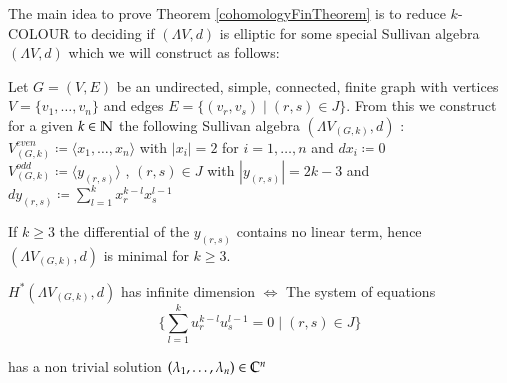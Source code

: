  The main idea to prove Theorem \ref{cohomologyFinTheorem} is to reduce $k$-COLOUR to deciding if $(\Lambda V,d)$ is elliptic for some special 
 Sullivan algebra $(\Lambda V,d)$ which we will construct as follows: \\
 
 \begin{Construction}
 \label{constructionOfSullivanAlgebra}
 Let $G = (V,E)$ be an undirected, simple, connected, finite graph with vertices $ V = \lbrace v_1, \dotsc , v_n \rbrace $
 and edges $ E = \lbrace (v_r, v_s) \; | \; (r,s) \in J \rbrace$. From this we construct for a given $k \in \mathbb{N}$ the following
 Sullivan algebra $(\Lambda V_{(G,k)} , d)$ : \\
 
 $ V^{even}_{(G,k)} \coloneqq \langle x_1, \dotsc , x_n \rangle $ \; with \; $|x_i| = 2$ \; for \; $ i = 1, \dotsc , n$ \; 
 and \; $dx_i \coloneqq 0$ \\
 
 $V^{odd}_{(G,k)} \coloneqq \langle y_{(r,s)} \rangle$ , $(r,s) \in J$ \; with \; $|y_{(r,s)}| = 2k - 3$ \; and \; $dy_{(r,s)} \coloneqq 
 \sum_{l = 1}^k x_r^{k -l} x_s^{l - 1}$ \\
 
 \end{Construction}

  If $k \geq 3$ the differential of the $y_{(r,s)}$ contains no linear term, hence
  $(\Lambda V_{(G,k)} ,d)$ is minimal for $k \geq 3$.
 
\begin{Lemma}
\label{lma:cohomoly+equations}
 $H^*(\Lambda V_{(G,k)}, d)$ has infinite dimension $\iff$ The system of equations \\
 \begin{equation}
 \label{systemofequations}
 {\lbrace \sum_{l = 1}^k u_r^{k - l} u_s^{l - 1} = 0 \; | \; (r,s) \in J \rbrace}  
 \end{equation}
 
 has a non trivial solution 
 $(\lambda_1 , \dotsc, \lambda_n) \in \mathbb{C}^n$
\end{Lemma}

